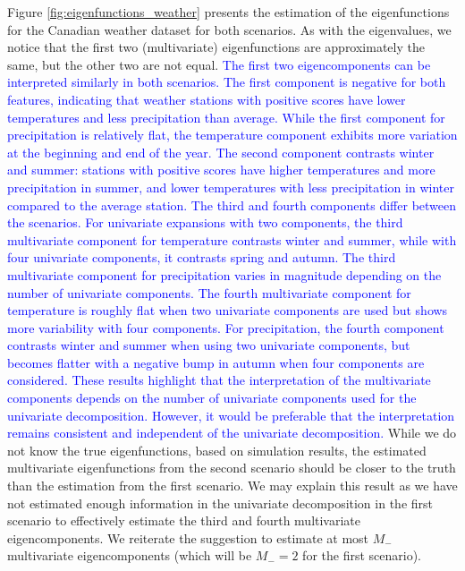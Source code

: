 Figure \ref{fig:eigenfunctions_weather} presents the estimation of the eigenfunctions for the Canadian weather dataset for both scenarios. As with the eigenvalues, we notice that the first two (multivariate) eigenfunctions are approximately the same, but the other two are not equal. \textcolor{blue}{The first two eigencomponents can be interpreted similarly in both scenarios. The first component is negative for both features, indicating that weather stations with positive scores have lower temperatures and less precipitation than average. While the first component for precipitation is relatively flat, the temperature component exhibits more variation at the beginning and end of the year. The second component contrasts winter and summer: stations with positive scores have higher temperatures and more precipitation in summer, and lower temperatures with less precipitation in winter compared to the average station. The third and fourth components differ between the scenarios. For univariate expansions with two components, the third multivariate component for temperature contrasts winter and summer, while with four univariate components, it contrasts spring and autumn. The third multivariate component for precipitation varies in magnitude depending on the number of univariate components. The fourth multivariate component for temperature is roughly flat when two univariate components are used but shows more variability with four components. For precipitation, the fourth component contrasts winter and summer when using two univariate components, but becomes flatter with a negative bump in autumn when four components are considered. These results highlight that the interpretation of the multivariate components depends on the number of univariate components used for the univariate decomposition. However, it would be preferable that the interpretation remains consistent and independent of the univariate decomposition.} While we do not know the true eigenfunctions, based on simulation results, the estimated multivariate eigenfunctions from the second scenario should be closer to the truth than the estimation from the first scenario. We may explain this result as we have not estimated enough information in the univariate decomposition in the first scenario to effectively estimate the third and fourth multivariate eigencomponents. We reiterate the suggestion to estimate at most $M_{-}$ multivariate eigencomponents (which will be $M_{-} = 2$ for the first scenario).
